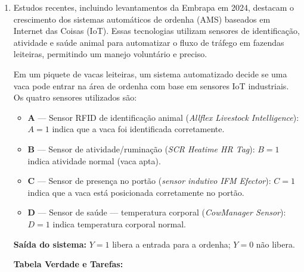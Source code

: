 \documentclass[12pt,a4paper]{article}
\begin{document}
\begin{enumerate}
    \begin{enumerate}[label=\Alph*)]
        \item Apenas a afirmação I está correta
        \item Apenas as afirmações I e II estão corretas
        \item Apenas as afirmações I e III estão corretas
        \item Apenas as afirmações II e IV estão corretas
        \item Apenas as afirmações II e III estão corretas
    \end{enumerate}
        \item Estudos recentes, incluindo levantamentos da Embrapa em 2024, destacam o crescimento dos sistemas automáticos de ordenha (AMS) baseados em Internet das Coisas (IoT). Essas tecnologias utilizam sensores de identificação, atividade e saúde animal para automatizar o fluxo de tráfego em fazendas leiteiras, permitindo um manejo voluntário e preciso.
    
    Em um piquete de vacas leiteiras, um sistema automatizado decide se uma vaca pode entrar na área de ordenha com base em sensores IoT industriais. Os quatro sensores utilizados são:
    
    \begin{itemize}[leftmargin=1cm, label=\textbullet]
      \item \textbf{A} — Sensor RFID de identificação animal (\textit{Allflex Livestock Intelligence}): $A = 1$ indica que a vaca foi identificada corretamente.
      \item \textbf{B} — Sensor de atividade/ruminação (\textit{SCR Heatime HR Tag}): $B = 1$ indica atividade normal (vaca apta).
      \item \textbf{C} — Sensor de presença no portão (\textit{sensor indutivo IFM Efector}): $C = 1$ indica que a vaca está posicionada corretamente no portão.
      \item \textbf{D} — Sensor de saúde — temperatura corporal (\textit{CowManager Sensor}): $D = 1$ indica temperatura corporal normal.
    \end{itemize}
    
    \textbf{Saída do sistema:} $Y = 1$ libera a entrada para a ordenha; $Y = 0$ não libera.
    
    
    \noindent\textbf{Tabela Verdade e Tarefas:}
    

\end{enumerate}
\end{document}

